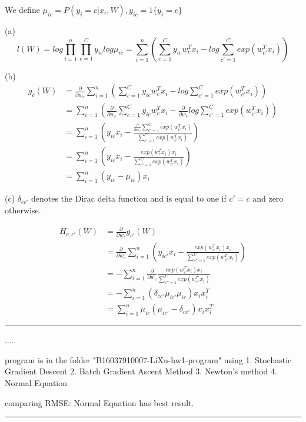 \documentclass[twoside]{article}
\newenvironment{problem}[2][Problem]{\begin{trivlist}
		\item[\hskip \labelsep {\bfseries #1}\hskip \labelsep {\bfseries #2.}]}{\end{trivlist}}
\newenvironment{solution}{{\bf Solution:}}{\hfill\rule{2mm}{2mm}}
\begin{document}
\begin{solution}
We define $\mu_{ic} = P(y_i = c | x_i, W), y_{ic} =1 \{y_i = c\}$

(a)
$$
l(W) = log \prod_{i=1}^{n} \prod_{c=1}^{C} y_{ic}log \mu_{ic} = \sum_{i=1}^{n}(\sum_{c=1}^{C}y_{ic}w_c^T x_i - log\sum_{c'=1}^{C}exp(w_{c'}^T x_i))
$$

(b)
\begin{align*}
g_c(W) &= \frac{\partial}{\partial w_c}\sum_{i=1}^{n}(\sum_{c=1}^{C} y_{ic}w_c^Tx_i - log\sum_{c'=1}^{C} exp(w_{c'}^T x_i)) \\
&= \sum_{i=1}^{n}(\frac{\partial}{\partial w_c}\sum_{c=1}^{C}y_{ic}w_c^Tx_i - \frac{\partial}{\partial w_c} log\sum_{c'=1}^{C}exp(w_{c'}^Tx_i)) \\
&= \sum_{i=1}^{n}(y_{ic}x_i - \frac{\frac{\partial}{\partial w_c} \sum_{c'=1}^{C}exp(w_{c'}^T x_i)}{\sum_{c'=1}^{C} exp(w_{c'}^Tx_i)}) \\
&=  \sum_{i=1}^{n}(y_{ic}x_i - \frac{exp(w_{c}^Tx_i)x_i}{\sum_{c'=1}^{C} exp(w_{c'}^Tx_i)}) \\
&= \sum_{i=1}^{n}(y_{ic}-\mu_{ic})x_i
\end{align*}

(c) $\delta_{cc'}$ denotes the Dirac delta function and is equal to one if $c' = c$ and zero otherwise.

\begin{align*}
H_{c,c'}(W) &= \frac{\partial}{\partial w_c}g_{c'}(W) \\
&= \frac{\partial}{\partial w_c} \sum_{i=1}^{n}(y_{ic'}x_i - \frac{exp(w_{c'}^Tx_i)x_i}{\sum_{c''=1}^{C} exp(w_{c''}^T x_i)})\\
&= - \sum_{i=1}^{n}\frac{\partial}{\partial w_c} \frac{exp(w_{c'}^T x_i)x_i}{\sum_{c''=1}^{C} exp(w_{c''}^Tx_i)} \\
&= - \sum_{i=1}^{n}(\delta_{cc'}\mu_{ic'}\mu_{ic})x_i x_i^T\\
&=  \sum_{i=1}^{n}\mu_{ic}(\mu_{ic'}-\delta_{cc'})x_i x_i^T
\end{align*}
	
\end{solution}

\begin{problem}{5}
	......
\end{problem}

\begin{solution}
	program is in the folder "B16037910007-LiXu-hw1-program"
	using 1. Stochastic Gradient Descent 2. Batch Gradient Ascent Method 3. Newton’s method 4. Normal Equation
	
	comparing RMSE: Normal Equation has best result.
\end{solution}
\end{document}
